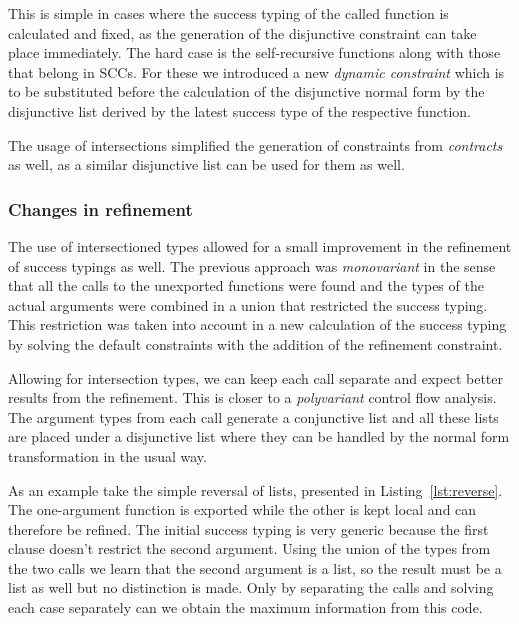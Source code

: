 This is simple in cases where the success typing of the called
function is calculated and fixed, as the generation of the disjunctive
constraint can take place immediately. The hard case is the
self-recursive functions along with those that belong in SCCs. For
these we introduced a new \emph{dynamic constraint} which is to be
substituted before the calculation of the disjunctive normal form by
the disjunctive list derived by the latest success type of the
respective function.

The usage of intersections simplified the generation of constraints
from \emph{contracts} as well, as a similar disjunctive list can be
used for them as well.

\subsubsection{Changes in refinement}
\label{sct:intersect_refinement}

The use of intersectioned types allowed for a small improvement in the
refinement of success typings as well. The previous approach was
\emph{monovariant} in the sense that all the calls to the unexported
functions were found and the types of the actual arguments were
combined in a union that restricted the success typing. This
restriction was taken into account in a new calculation of the success
typing by solving the default constraints with the addition of the
refinement constraint.

Allowing for intersection types, we can keep each call separate and
expect better results from the refinement. This is closer to a
\emph{polyvariant} control flow analysis. The argument types from each
call generate a conjunctive list and all these lists are placed under
a disjunctive list where they can be handled by the normal form
transformation in the usual way.

As an example take the simple reversal of lists, presented in
Listing~\ref{lst:reverse}. The one-argument function is exported while
the other is kept local and can therefore be refined. The initial
success typing is very generic because the first clause doesn't
restrict the second argument. Using the union of the types from the
two calls we learn that the second argument is a list, so the result
must be a list as well but no distinction is made. Only by separating
the calls and solving each case separately can we obtain the maximum
information from this code.

